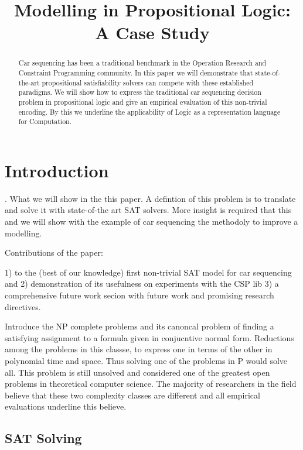 \documentclass[]{llncs}
\title{Modelling in Propositional Logic: A Case Study}
\newcommand{\todo}[1]{ {\color{red}{#1} }}
\begin{document}
 

\maketitle

\begin{abstract}
    Car sequencing has been a traditional benchmark in the Operation Research and Constraint Programming community. In
    this paper we will demonstrate that state-of-the-art propositional satisfiability solvers can compete with these
    established paradigms. We will show how to express the traditional car sequencing decision problem in propositional
    logic and give an empirical evaluation of this non-trivial encoding. By this we underline the applicability of Logic
    as a representation language for Computation.
\end{abstract}

\section{Introduction}
 
\todo{3. Do the introduction fully}. What we will show in the this paper. A defintion of this problem is to translate and solve it with state-of-the art
SAT solvers. More insight is required that this and we will show with  the example of car sequencing the methodoly to
improve a modelling. 

Contributions of the paper: 

1) to the (best of our knowledge) first non-trivial SAT model for car sequencing and 2) demonstration of its usefulness
on experiments with the CSP lib 3) a comprehensive future work secion with future work and promising research
directives. 

Introduce the NP complete problems \cite{Johnson79} and its canoncal problem of finding a satisfying assignment to a
formula given in conjucntive normal form. Reductions among the problems in this classse, to express one in terms of the
other in polynomial time and space. Thus solving one of the problems in P would solve all. This problem is still unsolved
and considered one of the greatest open problems in theoretical computer science. The majority of researchers in the
field believe that these two complexity classes are different and all empirical evaluations underline this believe. 

\subsection{SAT Solving}
\end{document}
